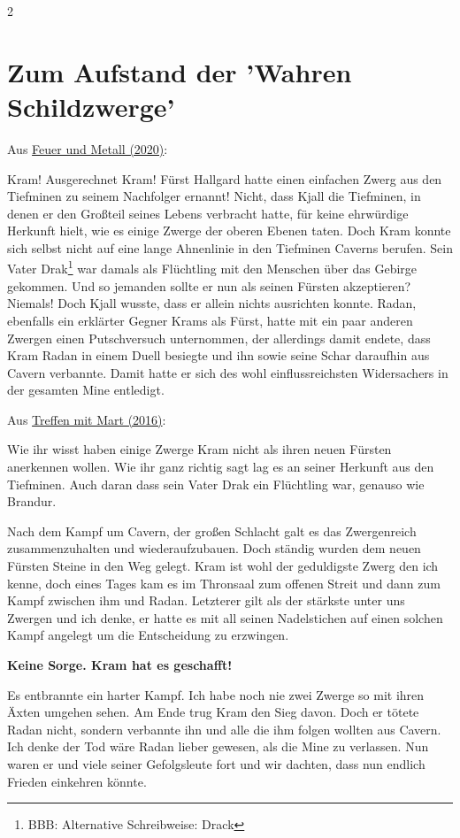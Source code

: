 \documentclass[10pt, a4paper, oneside]{book}
\begin{document}
\begin{multicols}{2}
\newpage %
\section{Zum Aufstand der 'Wahren Schildzwerge'}

\begin{center}
    Aus \hyperref[storytext-2020-feuer-und-metall]{Feuer und Metall (2020)}:
\end{center}

Kram! Ausgerechnet Kram! Fürst Hallgard hatte einen einfachen Zwerg aus den Tiefminen zu seinem Nachfolger ernannt! Nicht, dass Kjall die Tiefminen, in denen er den Großteil seines Lebens verbracht hatte, für keine ehrwürdige Herkunft hielt, wie es einige Zwerge der oberen Ebenen taten. Doch Kram konnte sich selbst nicht auf eine lange Ahnenlinie in den Tiefminen Caverns berufen. Sein Vater Drak\footnote{BBB: Alternative Schreibweise: Drack} war damals als Flüchtling mit den Menschen über das Gebirge gekommen. Und so jemanden sollte er nun als seinen Fürsten akzeptieren? Niemals! Doch Kjall wusste, dass er allein nichts ausrichten konnte. Radan, ebenfalls ein erklärter Gegner Krams als Fürst, hatte mit ein paar anderen Zwergen einen Putschversuch unternommen, der allerdings damit endete, dass Kram Radan in einem Duell besiegte und ihn sowie seine Schar daraufhin aus Cavern verbannte. Damit hatte er sich des wohl einflussreichsten Widersachers in der gesamten Mine entledigt.

\begin{center}
    Aus \hyperref[storytext-2016-treffen-mit-mart]{Treffen mit Mart (2016)}:
\end{center}



Wie ihr wisst haben einige Zwerge Kram nicht als ihren neuen Fürsten anerkennen wollen. Wie ihr ganz richtig sagt lag es an seiner Herkunft aus den Tiefminen. Auch daran dass sein Vater Drak ein Flüchtling war, genauso wie Brandur.

Nach dem Kampf um Cavern, der großen Schlacht galt es das Zwergenreich zusammenzuhalten und wiederaufzubauen. Doch ständig wurden dem neuen Fürsten Steine in den Weg gelegt. Kram ist wohl der geduldigste Zwerg den ich kenne, doch eines Tages kam es im Thronsaal zum offenen Streit und dann zum Kampf zwischen ihm und Radan. Letzterer gilt als der stärkste unter uns Zwergen und ich denke, er hatte es mit all seinen Nadelstichen auf einen solchen Kampf angelegt um die Entscheidung zu erzwingen.

\textbf{Keine Sorge. Kram hat es geschafft!}

Es entbrannte ein harter Kampf. Ich habe noch nie zwei Zwerge so mit ihren Äxten umgehen sehen. Am Ende trug Kram den Sieg davon. Doch er tötete Radan nicht, sondern verbannte ihn und alle die ihm folgen wollten aus Cavern. Ich denke der Tod wäre Radan lieber gewesen, als die Mine zu verlassen. Nun waren er und viele seiner Gefolgsleute fort und wir dachten, dass nun endlich Frieden einkehren könnte.


\columnbreak
\textbf{ }
\vfill

\end{multicols}
\end{document}
